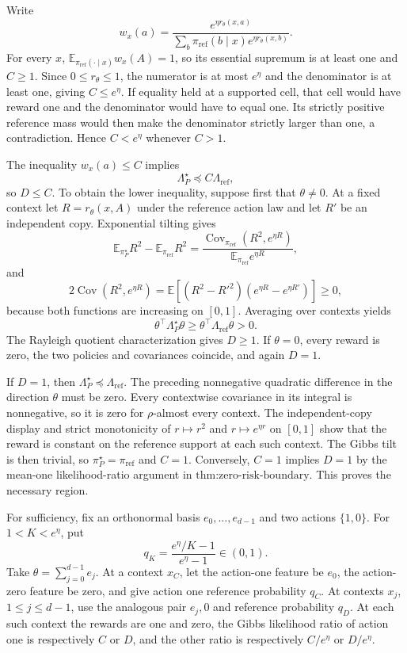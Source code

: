 Write
\[
w_x(a)=\frac{e^{\eta r_\theta(x,a)}}{\sum_b\pi_{\mathrm{ref}}(b\mid x)e^{\eta r_\theta(x,b)}}.
\]
For every \(x\), \(\mathbb E_{\pi_{\mathrm{ref}}(\cdot\mid x)}w_x(A)=1\), so its essential supremum is at least one and \(C\ge1\). Since \(0\le r_\theta\le1\), the numerator is at most \(e^\eta\) and the denominator is at least one, giving \(C\le e^\eta\). If equality held at a supported cell, that cell would have reward one and the denominator would have to equal one. Its strictly positive reference mass would then make the denominator strictly larger than one, a contradiction. Hence \(C<e^\eta\) whenever \(C>1\).

The inequality \(w_x(a)\le C\) implies
\[
\Lambda_P^\star\preceq C\Lambda_{\mathrm{ref}},
\]
so \(D\le C\). To obtain the lower inequality, suppose first that \(\theta\ne0\). At a fixed context let \(R=r_\theta(x,A)\) under the reference action law and let \(R'\) be an independent copy. Exponential tilting gives
\[
\mathbb E_{\pi_P^\star}R^2-\mathbb E_{\pi_{\mathrm{ref}}}R^2
=\frac{\operatorname{Cov}_{\pi_{\mathrm{ref}}}(R^2,e^{\eta R})}{\mathbb E_{\pi_{\mathrm{ref}}}e^{\eta R}},
\]
and
\[
2\operatorname{Cov}(R^2,e^{\eta R})
=\mathbb E[(R^2-R'^2)(e^{\eta R}-e^{\eta R'})]\ge0,
\]
because both functions are increasing on \([0,1]\). Averaging over contexts yields
\[
\theta^\top\Lambda_P^\star\theta\ge\theta^\top\Lambda_{\mathrm{ref}}\theta>0.
\]
The Rayleigh quotient characterization gives \(D\ge1\). If \(\theta=0\), every reward is zero, the two policies and covariances coincide, and again \(D=1\).

If \(D=1\), then \(\Lambda_P^\star\preceq\Lambda_{\mathrm{ref}}\). The preceding nonnegative quadratic difference in the direction \(\theta\) must be zero. Every contextwise covariance in its integral is nonnegative, so it is zero for \(\rho\)-almost every context. The independent-copy display and strict monotonicity of \(r\mapsto r^2\) and \(r\mapsto e^{\eta r}\) on \([0,1]\) show that the reward is constant on the reference support at each such context. The Gibbs tilt is then trivial, so \(\pi_P^\star=\pi_{\mathrm{ref}}\) and \(C=1\). Conversely, \(C=1\) implies \(D=1\) by the mean-one likelihood-ratio argument in \(\text{thm:zero-risk-boundary}\). This proves the necessary region.

For sufficiency, fix an orthonormal basis \(e_0,\ldots,e_{d-1}\) and two actions \(\{1,0\}\). For \(1<K<e^\eta\), put
\[
q_K=\frac{e^\eta/K-1}{e^\eta-1}\in(0,1).
\]
Take \(\theta=\sum_{j=0}^{d-1}e_j\). At a context \(x_C\), let the action-one feature be \(e_0\), the action-zero feature be zero, and give action one reference probability \(q_C\). At contexts \(x_j\), \(1\le j\le d-1\), use the analogous pair \(e_j,0\) and reference probability \(q_D\). At each such context the rewards are one and zero, the Gibbs likelihood ratio of action one is respectively \(C\) or \(D\), and the other ratio is respectively \(C/e^\eta\) or \(D/e^\eta\).

